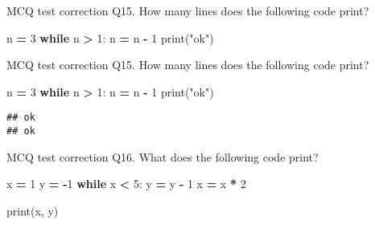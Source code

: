\documentclass[
  8pt,
  ignorenonframetext,
]{beamer}
\newenvironment{Shaded}{\begin{snugshade}}{\end{snugshade}}
\newcommand{\BuiltInTok}[1]{#1}
\newcommand{\ControlFlowTok}[1]{\textcolor[rgb]{0.13,0.29,0.53}{\textbf{#1}}}
\newcommand{\DecValTok}[1]{\textcolor[rgb]{0.00,0.00,0.81}{#1}}
\newcommand{\NormalTok}[1]{#1}
\newcommand{\OperatorTok}[1]{\textcolor[rgb]{0.81,0.36,0.00}{\textbf{#1}}}
\newcommand{\StringTok}[1]{\textcolor[rgb]{0.31,0.60,0.02}{#1}}
\begin{document}
\begin{frame}[fragile]{MCQ test correction}
\protect\hypertarget{mcq-test-correction-28}{}
Q15. How many lines does the following code print?

\begin{Shaded}
\begin{Highlighting}[]
\NormalTok{n }\OperatorTok{=} \DecValTok{3}
\ControlFlowTok{while}\NormalTok{ n }\OperatorTok{\textgreater{}} \DecValTok{1}\NormalTok{:}
\NormalTok{    n }\OperatorTok{=}\NormalTok{ n }\OperatorTok{{-}} \DecValTok{1}
    \BuiltInTok{print}\NormalTok{(}\StringTok{"ok"}\NormalTok{)}
\end{Highlighting}
\end{Shaded}
\end{frame}

\begin{frame}[fragile]{MCQ test correction}
\protect\hypertarget{mcq-test-correction-29}{}
Q15. How many lines does the following code print?

\begin{Shaded}
\begin{Highlighting}[]
\NormalTok{n }\OperatorTok{=} \DecValTok{3}
\ControlFlowTok{while}\NormalTok{ n }\OperatorTok{\textgreater{}} \DecValTok{1}\NormalTok{:}
\NormalTok{    n }\OperatorTok{=}\NormalTok{ n }\OperatorTok{{-}} \DecValTok{1}
    \BuiltInTok{print}\NormalTok{(}\StringTok{"ok"}\NormalTok{)}
\end{Highlighting}
\end{Shaded}

\begin{verbatim}
## ok
## ok
\end{verbatim}
\end{frame}

\begin{frame}[fragile]{MCQ test correction}
\protect\hypertarget{mcq-test-correction-30}{}
Q16. What does the following code print?

\begin{Shaded}
\begin{Highlighting}[]
\NormalTok{x }\OperatorTok{=} \DecValTok{1}
\NormalTok{y }\OperatorTok{=} \OperatorTok{{-}}\DecValTok{1}
\ControlFlowTok{while}\NormalTok{ x }\OperatorTok{\textless{}} \DecValTok{5}\NormalTok{:}
\NormalTok{    y }\OperatorTok{=}\NormalTok{ y }\OperatorTok{{-}} \DecValTok{1}
\NormalTok{    x }\OperatorTok{=}\NormalTok{ x }\OperatorTok{*} \DecValTok{2}

\BuiltInTok{print}\NormalTok{(x, y)}
\end{Highlighting}
\end{Shaded}
\end{frame}
\end{document}
